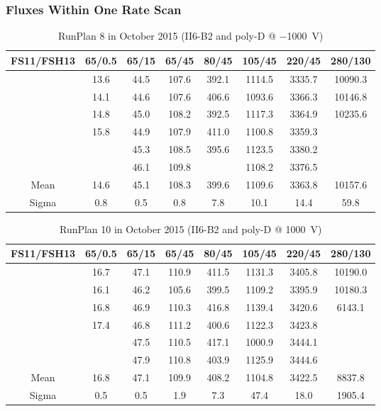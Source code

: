 \documentclass[9pt]{beamer}
\begin{document}
\begin{frame}
	\frametitle{Fluxes Within One Rate Scan}
	\begin{table}[t]
		\footnotesize
		\begin{tabular}{c|c|c|c|c|c|c|c}
			\toprule
			\textbf{FS11/FSH13}	& \textbf{65/0.5}	& \textbf{65/15}	& \textbf{65/45}	& \textbf{80/45}	& \textbf{105/45}	& \textbf{220/45}	& \textbf{280/130}\\\hline
					& 13.6	& 44.5	& 107.6	& 392.1	& 1114.5	& 3335.7	& 10090.3\\
					& 14.1	& 44.6	& 107.6	& 406.6	& 1093.6	& 3366.3	& 10146.8\\
					& 14.8	& 45.0	& 108.2	& 392.5	& 1117.3	& 3364.9	& 10235.6\\
					& 15.8	& 44.9	& 107.9	& 411.0	& 1100.8	& 3359.3	& \\
					& 		& 45.3	& 108.5	& 395.6	& 1123.5	& 3380.2	& \\
					& 		& 46.1	& 109.8	& 		& 1108.2	& 3376.5	& \\\hline
			Mean	& 14.6	& 45.1	& 108.3	& 399.6	& 1109.6	& 3363.8	& 10157.6\\
			Sigma	& 0.8	& 0.5	& 0.8	& 7.8	& 10.1		& 14.4		& 59.8\\
			\bottomrule
		\end{tabular}
		\caption{RunPlan 8 in October 2015 (II6-B2 and poly-D @ \SI{-1000}{V})}
	\end{table}
	\vspace*{-10pt}
	\begin{table}[t]
		\footnotesize
		\begin{tabular}{c|c|c|c|c|c|c|c}
			\toprule
			\textbf{FS11/FSH13}	& \textbf{65/0.5}	& \textbf{65/15}	& \textbf{65/45}	& \textbf{80/45}	& \textbf{105/45}	& \textbf{220/45}	& \textbf{280/130}\\\hline
					& 16.7	& 47.1	& 110.9	& 411.5	& 1131.3	& 3405.8	& 10190.0\\
					& 16.1	& 46.2	& 105.6	& 399.5	& 1109.2	& 3395.9	& 10180.3\\
					& 16.8	& 46.9	& 110.3	& 416.8	& 1139.4	& 3420.6	& {\color{red}6143.1}\\
					& 17.4	& 46.8	& 111.2	& 400.6	& 1122.3	& 3423.8	& \\
					& 		& 47.5	& 110.5	& 417.1	& {\color{red}1000.9}	& 3444.1	& \\
					& 		& 47.9	& 110.8	& 403.9	& 1125.9	& 3444.6	& \\\hline
			Mean	& 16.8	& 47.1	& 109.9	& 408.2	& 1104.8	& 3422.5	& 8837.8\\
			Sigma	& 0.5	& 0.5	& 1.9	& 7.3	& 47.4		& 18.0		& 1905.4\\
			\bottomrule
		\end{tabular}
		\caption{RunPlan 10 in October 2015 (II6-B2 and poly-D @ \SI{1000}{V})}
	\end{table}
\end{frame}
\end{document}
